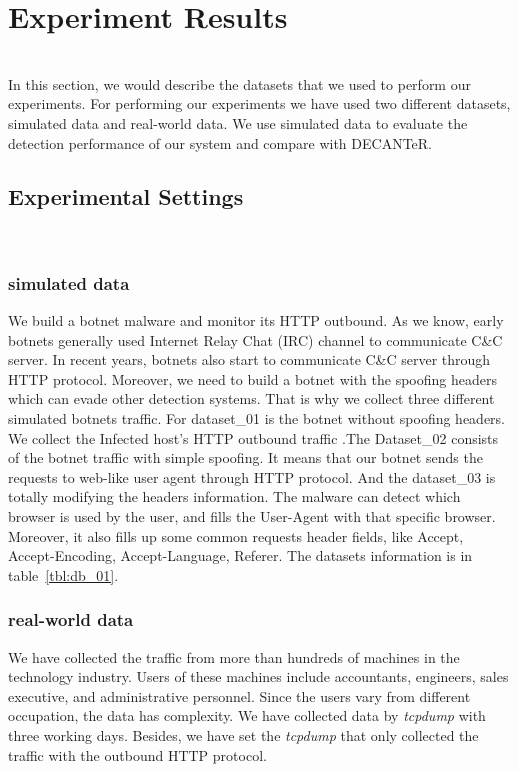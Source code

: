 \section{Experiment Results}

{\color{red}{Tony, pliz write overview here!!!}} \\
In this section, we would describe the datasets that we used to perform our experiments. For performing our experiments we have used two different datasets, simulated data and real-world data. We use simulated data to evaluate the detection performance of our system and compare with DECANTeR. \\


\subsection{Experimental Settings}

{\color{red}{Tony, pliz write like the followings in this subsection!}}\\

\subsubsection{simulated data} 
We build a botnet malware and monitor its HTTP outbound. As we know, early botnets generally used Internet Relay Chat (IRC) channel to communicate C\&C server. In recent years, botnets also start to communicate C\&C server through HTTP protocol. Moreover, we need to build a botnet with the spoofing headers which can evade other detection systems. That is why we collect three different simulated botnets traffic. For dataset\_01 is the botnet without spoofing headers. We collect the Infected host's HTTP outbound traffic .The Dataset\_02 consists of the botnet traffic with simple spoofing. It means that our botnet sends the requests to web-like user agent through HTTP protocol. And the dataset\_03 is totally modifying the headers information. The malware can detect which browser is used by the user, and fills the User-Agent with that specific browser. Moreover, it also fills up some common requests header fields, like Accept, Accept-Encoding, Accept-Language, Referer. The datasets information is in table~\ref{tbl:db_01}.

\subsubsection{real-world data}

We have collected the traffic from more than hundreds of machines in the technology industry. Users of these machines include accountants, engineers, sales executive, and administrative personnel. Since the users vary from different occupation, the data has complexity. We have collected data by \textit{tcpdump} with three working days. Besides, we have set the \textit{tcpdump} that only collected the traffic with the outbound HTTP protocol.

